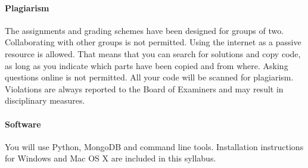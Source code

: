 \documentclass[a4paper]{report}
\begin{document}
\paragraph{Plagiarism}
The assignments and grading schemes have been designed for groups of two. Collaborating with other groups is not permitted. Using the internet as a passive resource is allowed. That means that you can search for solutions and copy code, as long as you indicate which parts have been copied and from where. Asking questions online is not permitted. All your code will be scanned for plagiarism. Violations are always reported to the Board of Examiners and may result in disciplinary measures.

\paragraph{Software}
You will use Python, MongoDB and command line tools. Installation instructions for Windows and Mac OS X are included in this syllabus.

\end{document}
